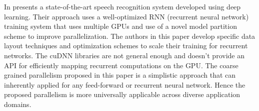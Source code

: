 In \cite{Hannun2014} presents a state-of-the-art speech recognition system developed using deep learning.
Their approach uses a well-optimized RNN (recurrent neural network) training system that uses multiple GPUs and use of a novel model partition
scheme to improve parallelization. The authors in this paper develop specific data layout techniques and optimization schemes to scale their training for recurrent networks. The cuDNN \cite{cuDNN} libraries are not general enough and doesn't provide an API for efficiently mapping recurrent computations on the GPU. The coarse grained parallelism proposed in this paper is a simplistic approach that can inherently applied for any feed-forward or recurrent neural network. Hence the proposed parallelism is more universally applicable across diverse application domains.


